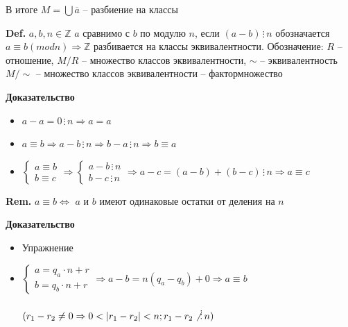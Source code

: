 \documentclass[14pt, letter paper]{article}
\begin{document}
В итоге $M = \bigcup \overline{a}$ -- разбиение на классы

\textbf{Def.} $a, b, n \in \mathbb{Z}$ $a$ сравнимо с $b$ по модулю $n$, если $(a-b) \, \vdots \, n$ обозначается $a \equiv b (mod n) \Rightarrow \mathbb{Z}$ разбивается на классы эквивалентности. Обозначение: $R$ -- отношение, $M/R$ -- множество классов эквивалентности, $\sim$ -- эквивалентность $M/\sim$ -- множество классов эквивалентности -- фактормножество

\begin{center}
    \textbf{Доказательство}
\end{center}

\begin{itemize}
    \item[Р:] $a - a = 0 \, \vdots \, n \Rightarrow a = a$
    \item[С:] $a \equiv b \Rightarrow a - b \, \vdots \, n \Rightarrow b - a \, \vdots \, n \Rightarrow b \equiv a$
    \item[Т:] $\begin{cases}
        a \equiv b \\
        b \equiv c
    \end{cases} \Rightarrow \begin{cases}
        a - b \, \vdots \, n \\
        b - c \, \vdots \, n
    \end{cases} \Rightarrow a - c = (a - b) + (b - c) \, \vdots \, n \Rightarrow a \equiv c$
\end{itemize}

\textbf{Rem.} $a \equiv b \Leftrightarrow$ $a$ и $b$ имеют одинаковые остатки от деления на $n$

\begin{center}
    \textbf{Доказательство}
\end{center}

\begin{itemize}
    \item[$\Leftarrow$] Упражнение
    \item[$\Rightarrow$] $\begin{cases}
        a = q_a \cdot n + r \\
        b = q_b \cdot n + r 
    \end{cases} \Rightarrow a - b = n(q_a - q_b) + 0 \Rightarrow a \equiv b$

    $(r_1 - r_2 \neq 0 \Rightarrow 0 < |r_1 - r_2| < n; r_1 - r_2 \not\, \vdots \, n)$
\end{itemize}
\end{document}
